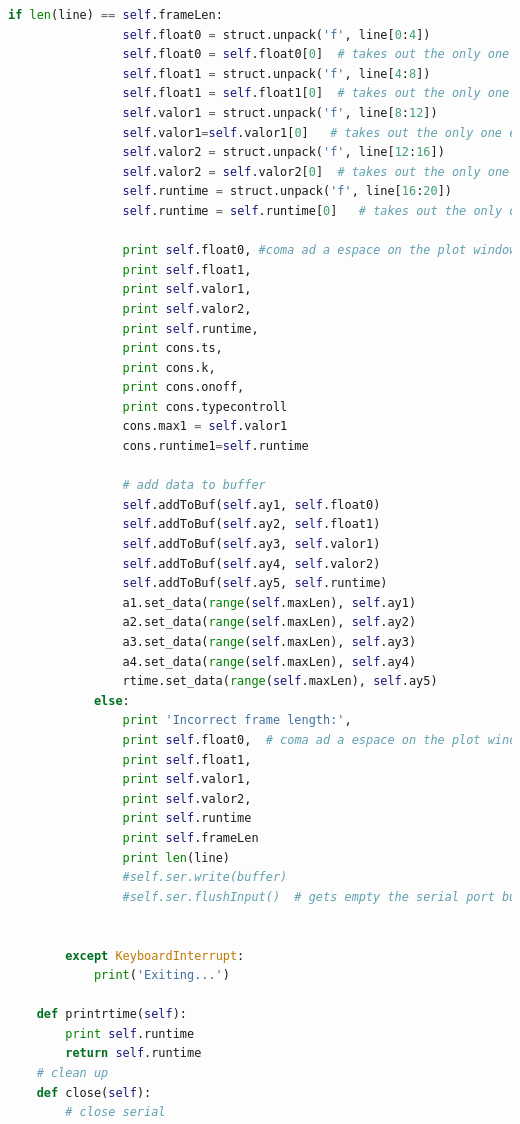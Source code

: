 {\begin{lstlisting}[language=python]
            if len(line) == self.frameLen:
                self.float0 = struct.unpack('f', line[0:4])
                self.float0 = self.float0[0]  # takes out the only one element from the tuple
                self.float1 = struct.unpack('f', line[4:8])
                self.float1 = self.float1[0]  # takes out the only one element from the tuple
                self.valor1 = struct.unpack('f', line[8:12])
                self.valor1=self.valor1[0]   # takes out the only one element from the tuple
                self.valor2 = struct.unpack('f', line[12:16])
                self.valor2 = self.valor2[0]  # takes out the only one element from the tuple
                self.runtime = struct.unpack('f', line[16:20])
                self.runtime = self.runtime[0]   # takes out the only one element from the tuple

                print self.float0, #coma ad a espace on the plot window
                print self.float1,
                print self.valor1,
                print self.valor2,
                print self.runtime,
                print cons.ts,
                print cons.k,
                print cons.onoff,
                print cons.typecontroll
                cons.max1 = self.valor1
                cons.runtime1=self.runtime

                # add data to buffer
                self.addToBuf(self.ay1, self.float0)
                self.addToBuf(self.ay2, self.float1)
                self.addToBuf(self.ay3, self.valor1)
                self.addToBuf(self.ay4, self.valor2)
                self.addToBuf(self.ay5, self.runtime)
                a1.set_data(range(self.maxLen), self.ay1)
                a2.set_data(range(self.maxLen), self.ay2)
                a3.set_data(range(self.maxLen), self.ay3)
                a4.set_data(range(self.maxLen), self.ay4)
                rtime.set_data(range(self.maxLen), self.ay5)
            else:
                print 'Incorrect frame length:',
                print self.float0,  # coma ad a espace on the plot window
                print self.float1,
                print self.valor1,
                print self.valor2,
                print self.runtime
                print self.frameLen
                print len(line)
                #self.ser.write(buffer)
                #self.ser.flushInput()  # gets empty the serial port buffer


        except KeyboardInterrupt:
            print('Exiting...')

    def printrtime(self):
        print self.runtime
        return self.runtime
    # clean up
    def close(self):
        # close serial


\end{lstlisting}}
